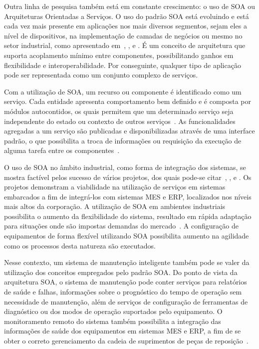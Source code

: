 Outra linha de pesquisa também está em constante crescimento: o uso de \gls{SOA} ou Arquiteturas
Orientadas a Serviços. O uso do padrão \gls{SOA} está evoluindo e está cada vez mais presente em
aplicações nos mais diversos segmentos, sejam eles a nível de dispositivos, na implementação de
camadas de negócios ou mesmo no setor industrial, como apresentado em~\cite{candido2010soa},
\cite{choi2010impact}, \cite{ragavan2012service} e \cite{papazoglou2007service}. É um conceito de
arquitetura que suporta acoplamento mínimo entre componentes, possibilitando ganhos em flexibilidade
e interoperabilidade. Por conseguinte, qualquer tipo de aplicação pode ser representada como um
conjunto complexo de serviços.

Com a utilização de \gls{SOA}, um recurso ou componente é identificado como um serviço. Cada
entidade apresenta comportamento bem definido e é composta por módulos autocontidos, os quais
permitem que um determinado serviço seja independente do estado ou contexto de outros
serviços~\cite{papazoglou2007service}. As funcionalidades agregadas a um serviço são publicadas e
disponibilizadas através de uma interface padrão, o que possibilita a troca de informações ou
requisição da execução de alguma tarefa entre os componentes~\cite{ragavan2012service}.

O uso de \gls{SOA} no âmbito industrial, como forma de integração dos sistemas, se mostra factível
pelos sucesso de vários projetos, dos quais pode-se citar~\cite{karnouskos2010towards},
\cite{bohn2006sirena}, \cite{de2006soda} e \cite{colombo2010factory}. Os projetos demonstram a
viabilidade na utilização de serviços em sistemas embarcados a fim de integrá-los com sistemas
\gls{MES} e \gls{ERP}, localizados nos níveis mais altos da corporação. A utilização de \gls{SOA} em
ambientes industriais possibilita o aumento da flexibilidade do sistema, resultado em rápida
adaptação para situações onde são impostas demandas do mercado~\cite{starke2013flexible}. A
configuração de equipamentos de forma flexível utilizando
\gls{SOA} possibilita aumento na agilidade como os processos desta natureza são executados.



Nesse contexto, um sistema de manutenção inteligente também pode se valer da utilização dos
conceitos empregados pelo padrão \gls{SOA}. Do ponto de vista da arquitetura \gls{SOA}, o sistema de
manutenção pode conter serviços para relatórios de saúde e falhas, informações sobre o prognóstico
do tempo de operação sem necessidade de manutenção, além de serviços de configuração de ferramentas
de diagnóstico ou dos modos de operação suportados pelo equipamento. O monitoramento remoto do
sistema também possibilita a integração das informações de saúde dos equipamentos em sistemas
\gls{MES} e \gls{ERP}, a fim de se obter o correto gerenciamento da cadeia de suprimentos de peças
de reposição~\cite{oldham2003delivering}.


